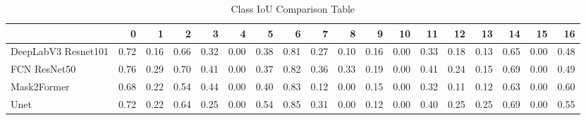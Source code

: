 \begin{table}
\centering
\caption{Class IoU Comparison Table}
\label{tab:class_iou_comparison}
\begin{tabular}{lrrrrrrrrrrrrrrrrr}
\toprule
{} &    0 &    1 &    2 &    3 &    4 &    5 &    6 &    7 &    8 &    9 &   10 &   11 &   12 &   13 &   14 &   15 &   16 \\
\midrule
DeepLabV3 Resnet101 & 0.72 & 0.16 & 0.66 & 0.32 & 0.00 & 0.38 & 0.81 & 0.27 & 0.10 & 0.16 & 0.00 & 0.33 & 0.18 & 0.13 & 0.65 & 0.00 & 0.48 \\
FCN ResNet50        & 0.76 & 0.29 & 0.70 & 0.41 & 0.00 & 0.37 & 0.82 & 0.36 & 0.33 & 0.19 & 0.00 & 0.41 & 0.24 & 0.15 & 0.69 & 0.00 & 0.49 \\
Mask2Former         & 0.68 & 0.22 & 0.54 & 0.44 & 0.00 & 0.40 & 0.83 & 0.12 & 0.00 & 0.15 & 0.00 & 0.32 & 0.11 & 0.12 & 0.63 & 0.00 & 0.60 \\
Unet                & 0.72 & 0.22 & 0.64 & 0.25 & 0.00 & 0.54 & 0.85 & 0.31 & 0.00 & 0.12 & 0.00 & 0.40 & 0.25 & 0.25 & 0.69 & 0.00 & 0.55 \\
\bottomrule
\end{tabular}
\end{table}
